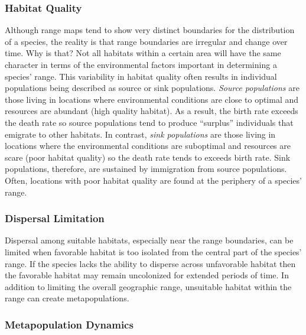 \documentclass[12pt, oneside]{article}   	%
\begin{document}
\subsubsection{Habitat Quality}

Although range maps tend to show very distinct boundaries for the distribution of a species, the reality is that range boundaries are irregular and change over time.  Why is that?  Not all habitats within a certain area will have the same character in terms of the environmental factors important in determining a species' range. This variability in habitat quality often results in individual populations being described as source or sink populations. \emph{Source populations} are those living in locations where environmental conditions are close to optimal and resources are abundant (high quality habitat).  As a result, the birth rate exceeds the death rate so source populations tend to produce ``surplus'' individuals that emigrate to other habitats. In contrast, \emph{sink populations} are those living in locations where the environmental conditions are suboptimal and resources are scare (poor habitat quality) so the death rate tends to exceeds birth rate. Sink populations, therefore, are sustained by immigration from source populations. Often, locations with poor habitat quality are found at the periphery of a species' range.  

\subsubsection{Dispersal Limitation}

Dispersal among suitable habitats, especially near the range boundaries, can be limited when favorable habitat is too isolated from the central part of the species' range.  If the species lacks the ability to disperse across unfavorable habitat then the favorable habitat may remain uncolonized for extended periods of time.  In addition to limiting the overall geographic range, unsuitable habitat within the range can create metapopulations. 

\subsubsection{Metapopulation Dynamics}
\end{document}
